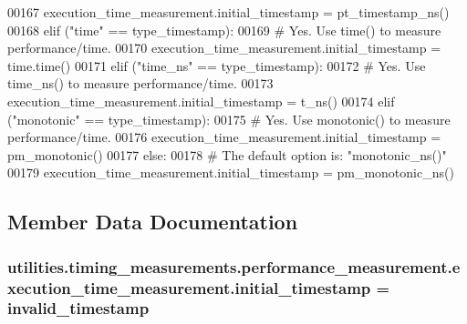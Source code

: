\begin{DoxyCode}
00167             execution\_time\_measurement.initial\_timestamp = pt\_timestamp\_ns()
00168         \textcolor{keywordflow}{elif} (\textcolor{stringliteral}{"time"} == type\_timestamp):
00169             \textcolor{comment}{# Yes. Use time() to measure performance/time.}
00170             execution\_time\_measurement.initial\_timestamp = time.time()
00171         \textcolor{keywordflow}{elif} (\textcolor{stringliteral}{"time\_ns"} == type\_timestamp):
00172             \textcolor{comment}{# Yes. Use time\_ns() to measure performance/time.}
00173             execution\_time\_measurement.initial\_timestamp = t\_ns()
00174         \textcolor{keywordflow}{elif} (\textcolor{stringliteral}{"monotonic"} == type\_timestamp):
00175             \textcolor{comment}{# Yes. Use monotonic() to measure performance/time.}
00176             execution\_time\_measurement.initial\_timestamp = pm\_monotonic()
00177         \textcolor{keywordflow}{else}:
00178             \textcolor{comment}{# The default option is: "monotonic\_ns()"}
00179             execution\_time\_measurement.initial\_timestamp = pm\_monotonic\_ns()
\end{DoxyCode}


\subsection{Member Data Documentation}
\hypertarget{classutilities_1_1timing__measurements_1_1performance__measurement_1_1execution__time__measurement_ac60d39fb6affbaa3d6eb2792c41ee7ff}{}
\subsubsection[{initial\+\_\+timestamp}]{\setlength{\rightskip}{0pt plus 5cm}utilities.\+timing\+\_\+measurements.\+performance\+\_\+measurement.\+execution\+\_\+time\+\_\+measurement.\+initial\+\_\+timestamp = {\bf invalid\+\_\+timestamp}\hspace{0.3cm}{\ttfamily [static]}}\label{classutilities_1_1timing__measurements_1_1performance__measurement_1_1execution__time__measurement_ac60d39fb6affbaa3d6eb2792c41ee7ff}


